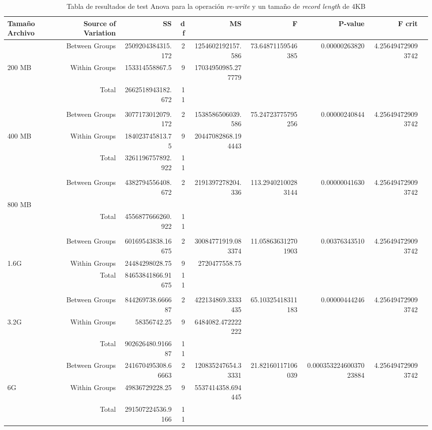 \begin{landscape}
\begin{table}[!htp]\centering
\caption{Tabla de resultados de test Anova para la operación \textit{re-write} y un tamaño de \textit{record length} de 4KB}\label{tab: }
\scriptsize
\begin{tabular}{lrrrrrrrr}\toprule
Tamaño Archivo &Source of Variation &SS &df &MS &F &P-value &F crit \\\midrule
&Between Groups &2509204384315.172 &2 &1254602192157.586 &73.64871159546385 &0.00000263820 &4.256494729093742 \\
200 MB &Within Groups &153314558867.5 &9 &17034950985.277779 & & & \\
&Total &2662518943182.672 &11 & & & & \\
& & & & & & & \\
&Between Groups &3077173012079.172 &2 &1538586506039.586 &75.24723775795256 &0.00000240844 &4.256494729093742 \\
400 MB &Within Groups &184023745813.75 &9 &20447082868.194443 & & & \\
&Total &3261196757892.922 &11 & & & & \\
& & & & & & & \\
&Between Groups &4382794556408.672 &2 &2191397278204.336 &113.29402100283144 &0.00000041630 &4.256494729093742 \\
800 MB & & & & & & & \\
&Total &4556877666260.922 &11 & & & & \\
& & & & & & & \\
&Between Groups &60169543838.16675 &2 &30084771919.083374 &11.058636312701903 &0.00376343510 &4.256494729093742 \\
1.6G &Within Groups &24484298028.75 &9 &2720477558.75 & & & \\
&Total &84653841866.91675 &11 & & & & \\
& & & & & & & \\
&Between Groups &844269738.666687 &2 &422134869.3333435 &65.10325418311183 &0.00000444246 &4.256494729093742 \\
3.2G &Within Groups &58356742.25 &9 &6484082.472222222 & & & \\
&Total &902626480.916687 &11 & & & & \\
&Between Groups &241670495308.66663 &2 &120835247654.33331 &21.82160117106039 &0.00035322460037023884 &4.256494729093742 \\
6G &Within Groups &49836729228.25 &9 &5537414358.694445 & & & \\
&Total &291507224536.9166 &11 & & & & \\
\bottomrule
\end{tabular}
\end{table}
\end{landscape}



